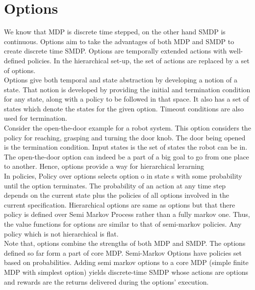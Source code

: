 \section{Options}

We know that MDP is discrete time stepped, on the other hand SMDP is continuous. Options aim to take the advantages of both MDP and SMDP to create discrete time SMDP. Options are temporally extended actions with well-defined policies. In the hierarchical set-up, the set of actions are replaced by a set of options. \\

Options give both temporal and state abstraction by developing a notion of a state. That notion is developed by providing the initial and termination condition for any state, along with a policy to be followed in that space. It also has a set of states which denote the states for the given option. Timeout conditions are also used for termination. \\

Consider the open-the-door example for a robot system. This option considers the policy for reaching, grasping and turning the door knob. The door being opened is the termination condition. Input states is the set of states the robot can be in. The open-the-door option can indeed be a part of a big goal to go from one place to another. Hence, options provide a way for hierarchical lerarning \\


In policies, Policy over options selects option o in state s with some probability until the option terminates. The probability of an action at any time step depends on the current state plus the policies of all options involved in the current specification.  Hierarchical options are same as options but that there policy is defined over Semi Markov Process rather than a fully markov one. Thus, the value functions for options are similar to that of semi-markov policies. Any policy which is not hierarchical is flat. \\


Note that, options combine the strengths of both MDP and SMDP. The options defined so far form a part of core MDP. Semi-Markov Options have policies set based on probabilities. 
Adding semi markov options to a core MDP (simple finite MDP with simplest option) yields discrete-time SMDP whose actions are options and rewards are the returns delivered during the options’ execution. \\

